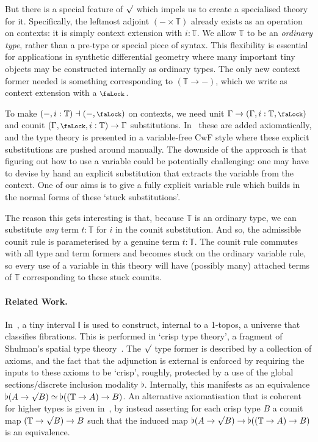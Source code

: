 \documentclass[10pt]{article}
\theoremstyle{definition}
\renewcommand{\equiv}{\simeq}
\newcommand{\lock}{\mathchoice {\scalebox{0.8}{\text{\faLock}}}
  {\scalebox{0.8}{\text{\faLock}}} {\scalebox{0.5}{\text{\faLock}}}
  {\scalebox{0.4}{\text{\faLock}}} }
\newcommand{\Tiny}{\mathbb{T}}
\newcommand{\lockn}[1]{\mathcal{#1}}
\newcommand{\ctxlocke}[1]{\lock_{#1}}
\newcommand{\ctxlock}[1]{\ctxlocke{\lockn{#1}}}
\newcommand{\rformsym}{\surd}
\newcommand{\rformu}[1]{\ThisStyle{\raisebox{0.07em}{$\SavedStyle \rformsym$}} #1}
\begin{document}
But there is a special feature of $\rformu$ which impels us to create
a specialised theory for it. Specifically, the leftmost adjoint
$(- \times \Tiny)$ already exists as an operation on contexts: it is
simply context extension with $i : \Tiny$. We allow $\Tiny$ to be an
\emph{ordinary type}, rather than a pre-type or special piece of
syntax. This flexibility is essential for applications in synthetic
differential geometry where many important tiny objects may be
constructed internally as ordinary types. The only new context former
needed is something corresponding to $(\Tiny \to -)$, which we write
as context extension with a $\ctxlock{}$.

To make $(-,i:\Tiny) \dashv (-,\lock)$ on contexts, we need unit
$\Gamma \to (\Gamma,i : \Tiny, \lock)$ and counit
$(\Gamma,\lock,i : \Tiny) \to \Gamma$ substitutions. In~\cite{fitchtt}
these are added axiomatically, and the type theory is presented in a
variable-free CwF style where these explicit substitutions are pushed
around manually. The downside of the approach is that figuring out how
to use a variable could be potentially challenging: one may have to
devise by hand an explicit substitution that extracts the variable
from the context. One of our aims is to give a fully explicit variable
rule which builds in the normal forms of these `stuck substitutions'.

The reason this gets interesting is that, because $\Tiny$ is an
ordinary type, we can substitute \emph{any} term $t : \Tiny$ for $i$
in the counit substitution. And so, the admissible counit rule is
parameterised by a genuine term $t : \Tiny$. The counit rule commutes
with all type and term formers and becomes stuck on the ordinary
variable rule, so every use of a variable in this theory will have
(possibly many) attached terms of $\Tiny$ corresponding to these stuck
counits.

\paragraph{Related Work.} 
In~\cite{lops}, a tiny interval $\mathbb{I}$ is used to construct,
internal to a 1-topos, a universe that classifies fibrations. This is
performed in `crisp type theory', a fragment of Shulman's spatial type
theory~\cite{mike:real-cohesive-hott}. The $\rformu$ type former is
described by a collection of axioms, and the fact that the adjunction
is external is enforced by requiring the inputs to these axioms to be
`crisp', roughly, protected by a use of the global sections/discrete
inclusion modality $\flat$. Internally, this manifests as an
equivalence
${\flat(A \to \rformu B) \equiv \flat((\Tiny \to A) \to B)}$. An
alternative axiomatisation that is coherent for higher types is given
in~\cite[Appendix A]{jaz:microlinear}, by instead asserting for each
crisp type $B$ a counit map $(\Tiny \to \rformu B) \to B$ such that
the induced map
${\flat(A \to \rformu B) \to \flat((\Tiny \to A) \to B)}$ is an
equivalence.
\end{document}
